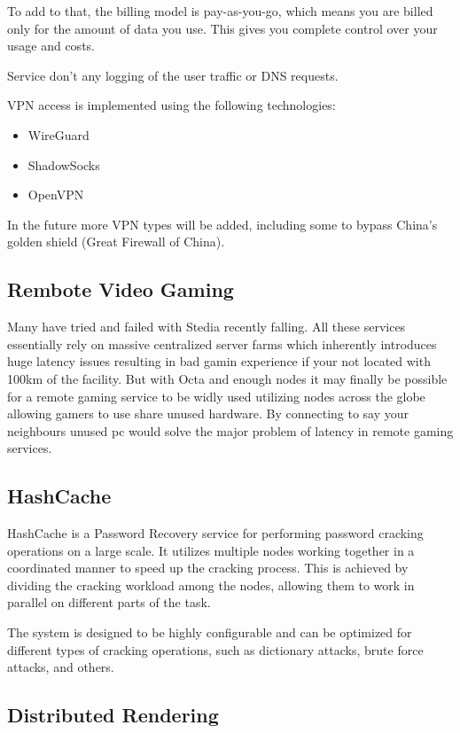 To add to that, the billing model is pay-as-you-go, which means you are billed only for the amount of data you use.
This gives you complete control over your usage and costs.

Service don’t any logging of the user traffic or DNS requests.

VPN access is implemented using the following technologies:

\begin{itemize}
    \item WireGuard
    \item ShadowSocks
    \item OpenVPN
\end{itemize}

In the future more VPN types will be added, including some to bypass China's golden shield (Great Firewall of China).
\subsection{Rembote Video Gaming}

Many have tried and failed with Stedia recently falling. All these services essentially rely on massive centralized server farms which inherently introduces huge latency issues resulting in bad gamin experience if your not located with 100km of the facility. 
But with Octa and enough nodes it may finally be possible for a remote gaming service to be widly used utilizing nodes across the globe allowing gamers to use share unused hardware. By connecting to say your neighbours unused pc would solve the major problem of latency in remote gaming services.

\subsection{HashCache}

HashCache is a Password Recovery service for performing password cracking operations on a large scale. It utilizes multiple nodes working together in a coordinated manner to speed up the cracking process. This is achieved by dividing the cracking workload among the nodes, allowing them to work in parallel on different parts of the task.

The system is designed to be highly configurable and can be optimized for different types of cracking operations, such as dictionary attacks, brute force attacks, and others.

\subsection{Distributed Rendering}

